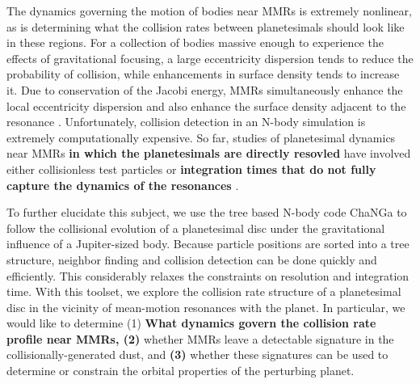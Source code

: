 \documentclass[fleqn,usenatbib]{mnras}
\begin{document}
The dynamics governing the motion of bodies near MMRs is extremely nonlinear, as is determining what the collision rates between planetesimals 
should look like in these regions. For a collection of bodies massive enough to experience the effects of gravitational focusing, a large eccentricity 
dispersion tends to reduce the probability of collision, while enhancements in surface density tends to increase it. Due to conservation of the Jacobi 
energy, MMRs simultaneously enhance the local eccentricity dispersion and also enhance the surface density adjacent to the resonance 
\citep{2000Icar..143...45R, 2017ApJ...850..103B}. Unfortunately, collision detection in an N-body simulation is extremely computationally expensive. 
So far, studies of planetesimal dynamics near MMRs \textbf{in which the planetesimals are directly resovled} have involved either collisionless test particles 
\citep{2017ApJ...850..103B, 2016ApJ...818..159T, 2018ApJ...857....3T} or \textbf{integration times that do not fully capture the dynamics of the resonances} \citep{2000Icar..143...45R, 2013ApJ...777L..31D}.

To further elucidate this subject, we use the tree based N-body code {\sc ChaNGa}\citep{2008IEEEpds...ChaNGa, 2015AphCom..2..1}  to follow the 
collisional evolution of a planetesimal disc under the gravitational influence of a Jupiter-sized body. Because particle positions are sorted into a tree 
structure, neighbor finding and collision detection can be done quickly and efficiently. This considerably relaxes the constraints on resolution and 
integration time. With this toolset, we explore the collision rate structure of a planetesimal disc in the vicinity of mean-motion resonances with the planet. In 
particular, we would like to determine (1) \textbf{What dynamics govern the collision rate profile near MMRs, (2)} whether MMRs leave a detectable signature in the collisionally-generated dust, and \textbf{(3)} whether these 
signatures can be used to determine or constrain the orbital properties of the perturbing planet.
\end{document}
